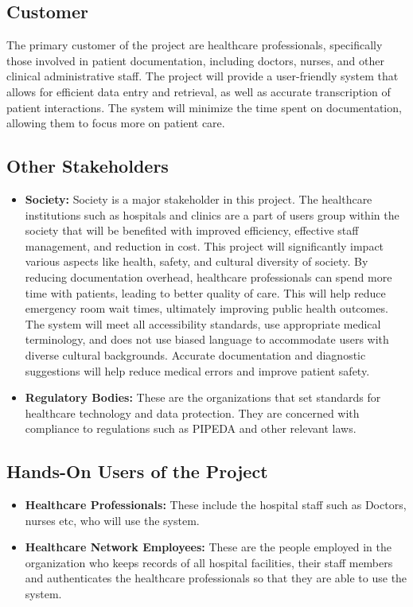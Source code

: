 \documentclass[12pt]{article}
\begin{document}
\subsection{Customer}
The primary customer of the project are healthcare professionals, specifically those involved in patient documentation, including doctors, nurses, and other clinical administrative staff. The project will provide a user-friendly system that allows for efficient data entry and retrieval, as well as accurate transcription of patient interactions. The system will minimize the time spent on documentation, allowing them to focus more on patient care.

\subsection{Other Stakeholders}
\begin{itemize}
  \item \textbf{Society:} Society is a major stakeholder in this project. The healthcare institutions such as hospitals and clinics are a part of users group within the society that will be benefited with improved efficiency, effective staff management, and reduction in cost. This project will significantly impact various aspects like health, safety, and cultural diversity of society. By reducing documentation overhead, healthcare professionals can spend more time with patients, leading to better quality of care. This will help reduce emergency room wait times, ultimately improving public health outcomes. The system will meet all accessibility standards, use appropriate medical terminology, and does not use biased language to accommodate users with diverse cultural backgrounds. Accurate documentation and diagnostic suggestions will help reduce medical errors and improve patient safety.

  \item \textbf{Regulatory Bodies:} These are the organizations that set standards for healthcare technology and data protection. They are concerned with compliance to regulations such as PIPEDA and other relevant laws.
\end{itemize}

\subsection{Hands-On Users of the Project}
\begin{itemize}
  \item\textbf{Healthcare Professionals:} These include the hospital staff such as Doctors, nurses etc, who will use the system.
  \item\textbf{Healthcare Network Employees:} These are the people employed in the organization who keeps records of all hospital facilities, their staff members and authenticates the healthcare professionals so that they are able to use the system. 
\end{itemize}
\end{document}
